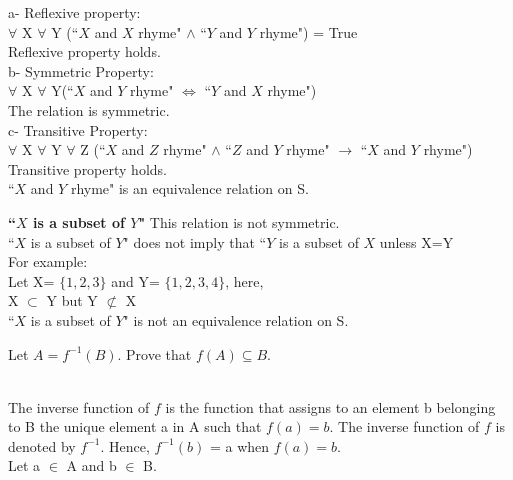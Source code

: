 \documentclass[addpoints]{exam}
\begin{document}
\begin{questions}
\begin{parts}
\begin{solution}
\begin{subparts}
    a- Reflexive property:\\
    $\forall$ X $\forall$ Y (``$X$ and $X$ rhyme" $\wedge$ ``$Y$ and $Y$ rhyme") = True\\
    Reflexive property holds.\\
    
    b- Symmetric Property:\\
     $\forall$ X $\forall$ Y(``$X$ and $Y$ rhyme" $\Leftrightarrow$ ``$Y$ and $X$ rhyme")\\
     The relation is symmetric.\\
    
    c- Transitive Property:\\
    $\forall$ X $\forall$ Y $\forall$ Z (``$X$ and $Z$ rhyme" $\wedge$ ``$Z$ and $Y$ rhyme" $\rightarrow$ ``$X$ and $Y$ rhyme")
    Transitive property holds.\\
    
    ``$X$ and $Y$ rhyme" is an equivalence relation on S.
    
    
    \subpart \textbf{``$X$ is a subset of $Y$"}
    This relation is not symmetric.\\
    ``$X$ is a subset of $Y$" does not imply that ``$Y$ is a subset of $X$ unless X=Y\\
    For example:\\
    Let X= $\{1,2,3\}$ and Y= $\{1,2,3,4\}$,
    here,\\
    X $\subset$ Y but Y $\not\subset$ X\\
    
    ``$X$ is a subset of $Y$" is not an equivalence relation on S.
    
    
    
  \end{subparts}
  \end{solution}

\end{parts}

\question[15] Let $A = f^{-1}(B)$. Prove that $f(A) \subseteq B$.
  \begin{solution}\\
    The inverse function of $f$ is the function that assigns to an element b belonging to B the unique element a in A such that $f(a) = b$. The inverse function of $f$ is denoted by $f^{-1}$. Hence, $f^{-1}(b)$ = a when $f(a) = b$.\\
    
    Let a $\in$ A and b $\in$ B.
    

\end{solution}
\end{questions}
\end{document}
